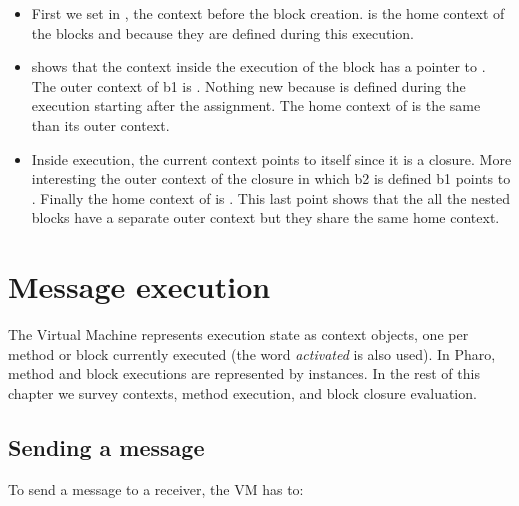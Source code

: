 \documentclass[a4paper,10pt,twoside]{book}
\begin{document}
\begin{itemize}
\item First we set in , the context before the block creation.  is the home context of the blocks  and  because they are defined during this execution.

\item {} shows that the context inside the execution of the block  has a pointer to . The outer context of b1 is . Nothing new because  is defined during the execution starting after the assignment. The home context of  is the same than its outer context.

\item Inside  execution, the current context points to  itself since it is a closure. More interesting 
the outer context of the closure in which b2 is defined \ie b1 points to . Finally the home context of  is . This last point shows that the all the nested blocks have a separate outer context but they share the same home context.
\end{itemize}


\section{Message execution}

The Virtual Machine represents execution state as context objects, one per method or block currently executed (the word \emph{activated} is also used). In Pharo, method and block executions are represented by  instances. In the rest of this chapter we survey contexts, method execution, and block closure evaluation.

\subsection{Sending a message}

To send a message to a receiver, the VM has to:
\end{document}
